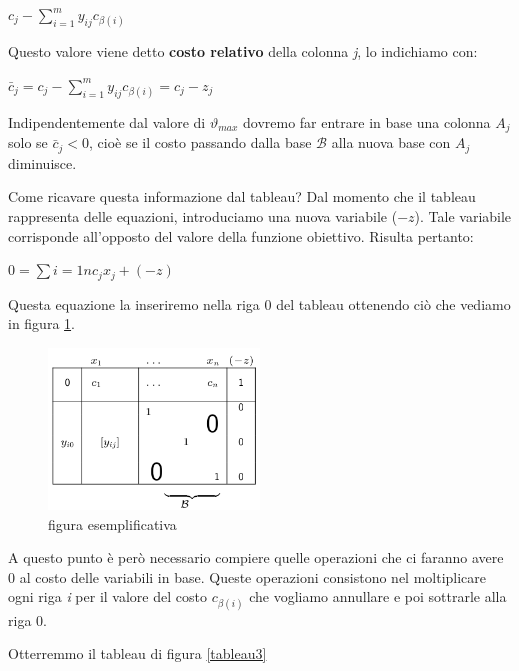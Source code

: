 \documentclass[11pt]{book}
\begin{document}
\begin{center}
$c_j - \sum\limits_{i=1}^m y_{ij} c_{\beta(i)}$
\end{center}

Questo valore viene detto {\bf costo relativo} della colonna {\em j},
lo indichiamo con:

\begin{center}
$\bar{c}_j = c_j - \sum\limits_{i=1}^m y_{ij}
c_{\beta(i)} = c_j - z_j$
\end{center}

Indipendentemente dal valore di $\vartheta_{max}$ dovremo far entrare
in base una colonna $A_j$ solo se $\bar{c}_j < 0$, cio\`e se il costo
passando dalla base $\mathcal{B}$ alla nuova base con $A_j$
diminuisce.

Come ricavare questa informazione dal tableau? Dal momento che il
tableau rappresenta delle equazioni, introduciamo una nuova variabile
($-z$). Tale variabile corrisponde all'opposto del valore della
funzione obiettivo. Risulta pertanto:

\begin{center}
$0 = \sum\limits{i=1}{n} c_jx_j + (-z)$  
\end{center}

Questa equazione la inseriremo nella riga 0 del tableau ottenendo
ci\`o che vediamo in figura \ref{tableau2}.

\begin{figure}[h!]
  \centering
  \includegraphics[width=0.5\textwidth]{images/tableau2.png}
  \caption{figura esemplificativa}
  \label{tableau2}
\end{figure}

A questo punto \`e per\`o necessario compiere quelle operazioni che ci
faranno avere 0 al costo delle variabili in base. Queste operazioni
consistono nel moltiplicare ogni riga {\em i} per il valore del costo
$c_{\beta(i)}$ che vogliamo annullare e poi sottrarle alla riga 0.

Otterremmo il tableau di figura \ref{tableau3}
\end{document}
